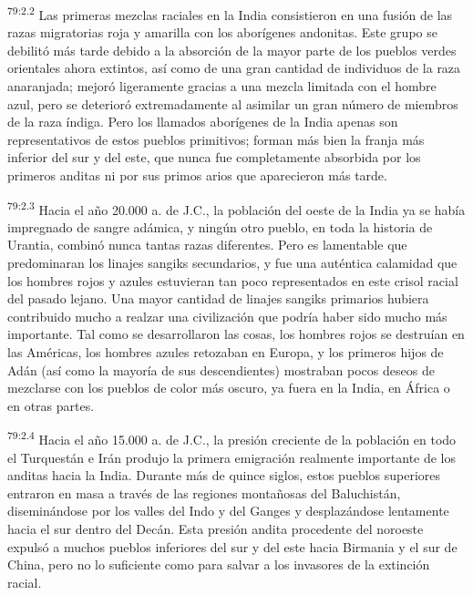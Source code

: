 \par
\textsuperscript{79:2.2} Las primeras mezclas raciales en la India consistieron en una fusión de las razas migratorias roja y amarilla con los aborígenes andonitas. Este grupo se debilitó más tarde debido a la absorción de la mayor parte de los pueblos verdes orientales ahora extintos, así como de una gran cantidad de individuos de la raza anaranjada; mejoró ligeramente gracias a una mezcla limitada con el hombre azul, pero se deterioró extremadamente al asimilar un gran número de miembros de la raza índiga. Pero los llamados aborígenes de la India apenas son representativos de estos pueblos primitivos; forman más bien la franja más inferior del sur y del este, que nunca fue completamente absorbida por los primeros anditas ni por sus primos arios que aparecieron más tarde.

\par
\textsuperscript{79:2.3} Hacia el año 20.000 a. de J.C., la población del oeste de la India ya se había impregnado de sangre adámica, y ningún otro pueblo, en toda la historia de Urantia, combinó nunca tantas razas diferentes. Pero es lamentable que predominaran los linajes sangiks secundarios, y fue una auténtica calamidad que los hombres rojos y azules estuvieran tan poco representados en este crisol racial del pasado lejano. Una mayor cantidad de linajes sangiks primarios hubiera contribuido mucho a realzar una civilización que podría haber sido mucho más importante. Tal como se desarrollaron las cosas, los hombres rojos se destruían en las Américas, los hombres azules retozaban en Europa, y los primeros hijos de Adán (así como la mayoría de sus descendientes) mostraban pocos deseos de mezclarse con los pueblos de color más oscuro, ya fuera en la India, en
África o en otras partes.

\par
\textsuperscript{79:2.4} Hacia el año 15.000 a. de J.C., la presión creciente de la población en todo el Turquestán e Irán produjo la primera emigración realmente importante de los anditas hacia la India. Durante más de quince siglos, estos pueblos superiores entraron en masa a través de las regiones montañosas del Baluchistán, diseminándose por los valles del Indo y del Ganges y desplazándose lentamente hacia el sur dentro del Decán. Esta presión andita procedente del noroeste expulsó a muchos pueblos inferiores del sur y del este hacia Birmania y el sur de China, pero no lo suficiente como para salvar a los invasores de la extinción racial.

